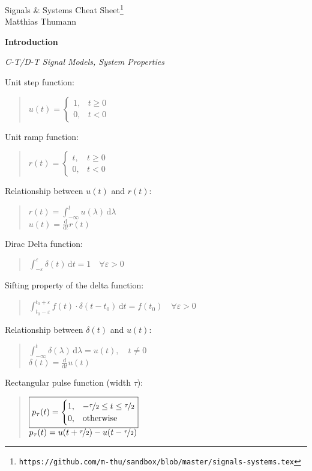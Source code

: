 \documentclass[fontsize=9pt,a4paper,twocolumn]{scrartcl}
\begin{document}
\clearpage
\pagestyle{empty}
\huge{Signals \& Systems Cheat Sheet}\footnote{\small{\texttt{https://github.com/m-thu/sandbox/blob/master/signals-systems.tex}}}\\
\large{Matthias Thumann}
\vspace*{0.5cm}

\large{\textbf{Introduction}}

\textit{C-T/D-T Signal Models, System Properties}

Unit step function:
\begin{quote}
	$\boxed{u(t)=\begin{cases}1,& t\geq 0\\ 0,& t<0\end{cases}}$
\end{quote}

Unit ramp function:
\begin{quote}
	$\boxed{r(t)=\begin{cases}t,& t\geq 0\\ 0,& t<0\end{cases}}$
\end{quote}

Relationship between $u(t)$ and $r(t)$:
\begin{quote}
	$r(t) = \int_{-\infty}^t u(\lambda)\,\mathrm{d}\lambda$\\
	$u(t) = \frac{\mathrm{d}}{\mathrm{d}t}r(t)$
\end{quote}

Dirac Delta function:
\begin{quote}
	$\int_{-\varepsilon}^\varepsilon \delta(t)\,\mathrm{d}t = 1\quad\forall\varepsilon>0$
\end{quote}

Sifting property of the delta function:
\begin{quote}
	$\boxed{\int_{t_0-\varepsilon}^{t_0+\varepsilon} f(t)\cdot\delta(t-t_0)\,\mathrm{d}t = f(t_0)\quad\forall\varepsilon>0}$
\end{quote}

Relationship between $\delta(t)$ and $u(t)$:
\begin{quote}
	$\int_{-\infty}^t \delta(\lambda)\,\mathrm{d}\lambda = u(t),\quad t\neq 0$\\
	$\delta(t) = \frac{\mathrm{d}}{\mathrm{d}t} u(t)$
\end{quote}

Rectangular pulse function (width $\tau$):
\begin{quote}
	$\boxed{p_\tau(t) = \begin{cases}1,& -\nicefrac{\tau}{2}\leq t\leq\nicefrac{\tau}{2}\\ 0,& \text{otherwise}\end{cases}}$\\
	$p_\tau(t) = u(t+\nicefrac{\tau}{2}) - u(t-\nicefrac{\tau}{2})$
\end{quote}
\end{document}
